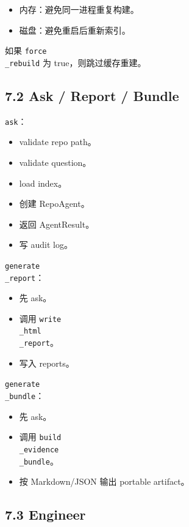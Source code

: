 \documentclass[UTF8,12pt,openany]{ctexbook}
\begin{document}
\begin{itemize}
\item 内存：避免同一进程重复构建。
\item 磁盘：避免重启后重新索引。
\end{itemize}

如果 \texttt{force\\_rebuild} 为 true，则跳过缓存重建。\par

\subsection{7.2 Ask / Report / Bundle}

\texttt{ask}：\par

\begin{itemize}
\item validate repo path。
\item validate question。
\item load index。
\item 创建 RepoAgent。
\item 返回 AgentResult。
\item 写 audit log。
\end{itemize}

\texttt{generate\\_report}：\par

\begin{itemize}
\item 先 ask。
\item 调用 \texttt{write\\_html\\_report}。
\item 写入 reports。
\end{itemize}

\texttt{generate\\_bundle}：\par

\begin{itemize}
\item 先 ask。
\item 调用 \texttt{build\\_evidence\\_bundle}。
\item 按 Markdown/JSON 输出 portable artifact。
\end{itemize}

\subsection{7.3 Engineer}
\end{document}
